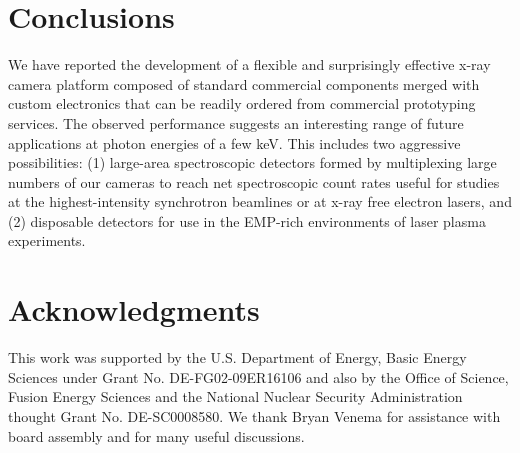 \FloatBarrier

\section{Conclusions}
We have reported the development of a flexible and
surprisingly effective x-ray camera platform composed of standard
commercial components merged with custom electronics that can be readily
ordered from commercial prototyping services. The observed performance
suggests an interesting range of future applications at photon energies
of a few keV. This includes two aggressive possibilities: (1) large-area
spectroscopic detectors formed by multiplexing large numbers of our
cameras to reach net spectroscopic count rates useful for studies at the
highest-intensity synchrotron beamlines or at x-ray free electron
lasers, and (2) disposable detectors for use in the EMP-rich
environments of laser plasma experiments.

\section*{Acknowledgments}
This work was supported by the U.S.
Department of Energy, Basic Energy Sciences under Grant No.
DE-FG02-09ER16106 and also by the Office of Science, Fusion Energy
Sciences and the National Nuclear Security Administration thought Grant
No. DE-SC0008580. We thank Bryan Venema for assistance with board
assembly and for many useful discussions.


